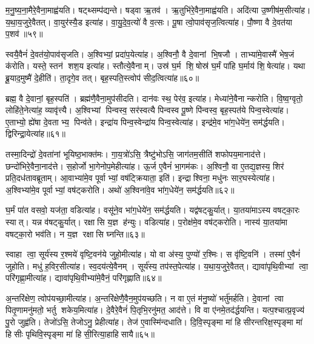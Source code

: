 म॒नु॒ष्य॒ना॒मैरे॒वैना॒माह्व॑यति। 
षट्थ्सम्प॑द्यन्ते। 
षड्वा ऋ॒तव॑। 
ऋ॒तुभि॑रे॒वैना॒माह्व॑यति। 
अदि॑त्या उ॒ष्णीष॑म॒सीत्या॑ह। 
य॒था॒य॒जुरे॒वैतत्। 
वा॒युर॑स्यै॒ड इत्या॑ह। 
वा॒यु॒दे॒व॒त्यो॑ वै व॒त्सः। 
पू॒षा त्वो॒पाव॑सृज॒त्वित्या॑ह। 
पौ॒ष्णा वै दे॒वत॑या प॒शव॑॥५९॥

स्वयै॒वैनं॑ दे॒वत॑यो॒पाव॑सृजति। 
अ॒श्विभ्यां॒ प्रदा॑प॒येत्या॑ह। 
अ॒श्विनौ॒ वै दे॒वानां भि॒षजौ। 
ताभ्या॑मे॒वास्मै॑ भेष॒जं क॑रोति। 
यस्ते॒ स्तन॑ शश॒य इत्या॑ह। 
स्तौत्ये॒वैनाम्। 
उस्र॑ घ॒र्म शि॒षोस्र॑ घ॒र्मं पा॑हि घ॒र्माय॑ शि॒षेत्या॑ह। 
यथा ब्रू॒याद॒मुष्मै॑ दे॒हीति॑। 
ता॒दृगे॒व तत्। 
बृह॒स्पति॒स्त्वोप॑ सीद॒त्वित्या॑ह॥६०॥

ब्रह्म॒ वै दे॒वानां॒ बृह॒स्पति॑। 
ब्रह्म॑णै॒वैना॒मुप॑सीदति। 
दान॑वः स्थ॒ पेर॑व॒ इत्या॑ह। 
मेध्या॑ने॒वैनान्करोति। 
वि॒ष्व॒ग्वृतो॒ लोहि॑ते॒नेत्या॑ह॒ व्यावृ॑त्त्यै। 
अ॒श्विभ्यां पिन्वस्व॒ सर॑स्वत्यै पिन्वस्व पू॒ष्णे पि॑न्वस्व॒ बृह॒स्पत॑ये पिन्व॒स्वेत्या॑ह। 
ए॒ताभ्यो॒ ह्ये॑षा दे॒वताभ्य॒ पिन्व॑ते। 
इन्द्रा॑य पिन्व॒स्वेन्द्रा॑य पिन्व॒स्वेत्या॑ह। 
इन्द्र॑मे॒व भा॑ग॒धेये॑न॒ सम॑र्द्धयति। 
द्विरिन्द्रा॒येत्या॑ह॥६१॥

तस्मा॒दिन्द्रो॑ दे॒वता॑नां भूयिष्ठ॒भाक्त॑मः। 
गा॒य॒त्रो॑ऽसि॒ त्रैष्टु॑भोऽसि॒ जाग॑तम॒सीति॑ शफोपय॒मानाद॑त्ते। 
छन्दो॑भि\-रे॒वैना॒नाद॑त्ते। 
स॒होर्जो भा॒गेनोप॒मेहीत्या॑ह। 
ऊ॒र्ज ए॒वैनं॑ भा॒गम॑कः। 
अ॒श्विनौ॒ वा ए॒तद्य॒ज्ञस्य॒ शिर॑ प्रति॒दध॑तावब्रूताम्। 
आ॒वाभ्या॑मे॒व पूर्वाभ्यां॒ वष॑ट्क्रियाता॒ इति॑। 
इन्द्राश्विना॒ मधु॑नः सार॒घस्येत्या॑ह। 
अ॒श्विभ्या॑मे॒व पूर्वाभ्यां॒ वष॑ट्करोति। 
अथो॑ अ॒श्विना॑वे॒व भा॑ग॒धेये॑न॒ सम॑र्द्धयति॥६२॥

घ॒र्मं पा॑त वसवो॒ यज॑ता॒ वडित्या॑ह। 
वसू॑ने॒व भा॑ग॒धेये॑न॒ सम॑र्द्धयति। 
यद्व॑षट्कु॒र्यात्। 
या॒तया॑माऽस्य वषट्का॒रः स्यात्। 
यन्न व॑षट्कु॒र्यात्। 
रक्षासि य॒ज्ञ ह॑न्युः। 
वडित्या॑ह। 
प॒रोक्ष॑मे॒व वष॑ट्करोति। 
नास्य॑ या॒तया॑मा वषट्का॒रो भव॑ति। 
न य॒ज्ञ रक्षासि घ्नन्ति॥६३॥

स्वाहा त्वा॒ सूर्य॑स्य र॒श्मये॑ वृष्टि॒वन॑ये जुहो॒मीत्या॑ह। 
यो वा अ॑स्य॒ पुण्यो॑ र॒श्मिः। 
स वृ॑ष्टि॒वनि॑। 
तस्मा॑ ए॒वैनं॑ जुहोति। 
मधु॑ ह॒विर॒सीत्या॑ह। 
स्व॒दय॑त्ये॒वैनम्। 
सूर्य॑स्य॒ तप॑स्त॒पेत्या॑ह। 
य॒था॒य॒जुरे॒वैतत्। 
द्यावा॑पृथि॒वीभ्यां त्वा॒ परि॑गृह्णा॒मीत्या॑ह। 
द्यावा॑पृथि॒वीभ्या॑मे॒वैनं॒ परि॑गृह्णाति॥६४॥

अ॒न्तरि॑क्षेण॒ त्वोप॑यच्छा॒मीत्या॑ह। 
अ॒न्तरि॑क्षेणै॒वैन॒मुप॑यच्छति। 
न वा ए॒तं म॑नु॒ष्यो॑ भर्तु॑मर्\mbox{}हति। 
दे॒वानां त्वा पितृ॒णामनु॑मतो॒ भर्तु शकेय॒मित्या॑ह। 
दे॒वैरे॒वैनं॑ पि॒तृभि॒रनु॑मत॒ आद॑त्ते। 
वि वा ए॑नमे॒तद॑र्द्धयन्ति। 
यत्प॒श्चात्प्र॒वृज्य॑ पु॒रो जुह्व॑ति। 
तेजो॑ऽसि॒ तेजोऽनु॒ प्रेहीत्या॑ह। 
तेज॑ ए॒वास्मि॑न्दधाति। 
दि॒वि॒स्पृङ्मा मा॑ हिसीरन्तरिक्ष॒स्पृङ्मा मा॑ हिसीः पृथिवि॒स्पृङ्मा मा॑ हिसी॒रित्या॒हाहिसायै॥६५॥

